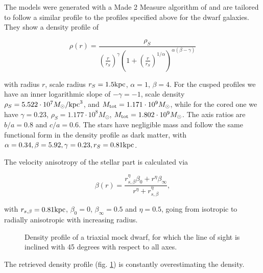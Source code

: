 The models were generated with a Made 2 Measure algorithm of
\cite{Dehnen2009} and are tailored to follow a similar profile to the
profiles specified above for the dwarf galaxies. They show a density
profile of

\begin{equation}
    \rho(r)=\frac{\rho_S}{\left(\frac{r}{r_S}\right)^\gamma\left(1+\left(\frac{r}{r_S}\right)^{1/\alpha}\right)^{\alpha(\beta-\gamma)}}
\end{equation}

with radius $r$, scale radius $r_S=1.5\mathrm{kpc}$, $\alpha=1$,
$\beta=4$. For the cusped profiles we have an inner logarithmic slope
of $-\gamma=-1$, scale density $\rho_S=5.522\cdot 10^7M_\odot/\mathrm{kpc}^3$,
and $M_{\mathrm{tot}}=1.171\cdot10^9M_\odot$, while for the cored one we have
$\gamma=0.23$, $\rho_S=1.177\cdot10^8M_\odot$,
$M_{\mathrm{tot}}=1.802\cdot10^9M_\odot$. The axis ratios are $b/a=0.8$ and
$c/a=0.6$. The stars have negligible mass and follow the same
functional form in the density profile as dark matter, with
$\alpha=0.34, \beta=5.92, \gamma=0.23, r_S=0.81\mathrm{kpc}$.

The velocity anisotropy of the stellar part is calculated via

\begin{equation}
\beta(r)=\frac{r_{s,\beta}^\eta \beta_0+r^\eta \beta_\infty}{r^\eta+r_{s,\beta}^\eta},
\end{equation}

with $r_{s,\beta}=0.81\mathrm{kpc}$, $\beta_0=0$, $\beta_\infty=0.5$ and
$\eta=0.5$, going from isotropic to radially anisotropic with
increasing radius.

\begin{figure}
    \begin{center}
        \hspace{-7mm}
        \caption{Density profile of a triaxial mock dwarf, for which the line
          of sight is inclined with 45 degrees with respect to all axes.}
        \label{fig:triax}
    \end{center}
\end{figure}

The retrieved density profile (fig. \ref{fig:triax}) is constantly
overestimating the density.


